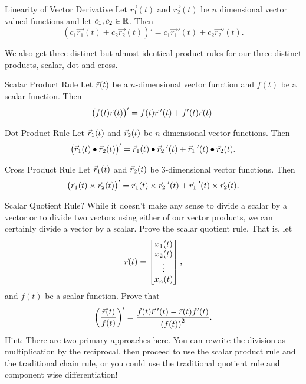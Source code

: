 \begin{claim}{Linearity of Vector Derivative}
Let $\vec{r_1}(t)$ and $\vec{r_2}(t)$ be $n$ dimensional vector valued functions and let $c_1,c_2\in\mathbb{R}$. Then $$\left(c_1\vec{r_1}(t)+c_2 \vec{r_2}(t)\right)'=c_1\vec{r_1}'(t)+c_2\vec{r_2}'(t).$$ 
\end{claim}

We also get three distinct but almost identical product rules for our three distinct products, scalar, dot and cross.

\begin{claim}{Scalar Product Rule}
Let $\vec{r}(t)$ be a $n$-dimensional vector function and $f(t)$ be a scalar function. Then $$\big(f(t)\vec{r}(t)\big)'=f(t)\vec{r}\hspace{0.2em}'(t)+f'(t)\vec{r}(t).$$
\end{claim}

\begin{claim}{Dot Product Rule}
Let $\vec{r}_1(t)$ and $\vec{r}_2(t)$ be $n$-dimensional vector functions. Then $$\big(\vec{r}_1(t)\bullet\vec{r}_2(t)\big)'=\vec{r}_1(t)\bullet\vec{r}_2\hspace{0.2em}'(t)+\vec{r}_1\hspace{0.2em}'(t)\bullet\vec{r}_2(t).$$
\end{claim}

\begin{claim}{Cross Product Rule}
Let $\vec{r}_1(t)$ and $\vec{r}_2(t)$ be $3$-dimensional vector functions. Then $$\big(\vec{r}_1(t)\times\vec{r}_2(t)\big)'=\vec{r}_1(t)\times\vec{r}_2\hspace{0.2em}'(t)+\vec{r}_1\hspace{0.2em}'(t)\times\vec{r}_2(t).$$
\end{claim}

\begin{exercise}{Scalar Quotient Rule?}
While it doesn't make any sense to divide a scalar by a vector or to divide two vectors using either of our vector products, we can certainly divide a vector by a scalar. Prove the scalar quotient rule. That is, let $$\vec{r}(t)=\begin{bmatrix}x_1(t)\\x_2(t)\\ \vdots\\x_n(t)\end{bmatrix},$$ and $f(t)$ be a scalar function. Prove that $$\left(\frac{\vec{r}(t)}{f(t)}\right)'=\frac{f(t)\vec{r}\hspace{0.2em}'(t)-\vec{r}(t)f'(t)}{\left(f(t)\right)^2}. $$ Hint: There are two primary approaches here. You can rewrite the division as multiplication by the reciprocal, then proceed to use the scalar product rule and the traditional chain rule, or you could use the traditional quotient rule and component wise differentiation!
\end{exercise}

